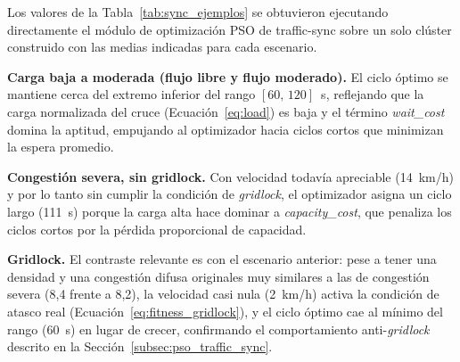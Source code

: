 Los valores de la Tabla~\ref{tab:sync_ejemplos} se obtuvieron ejecutando directamente el módulo de optimización PSO de traffic-sync sobre un solo clúster construido con las medias indicadas para cada escenario.

\textbf{Carga baja a moderada (flujo libre y flujo moderado).} El ciclo óptimo se mantiene cerca del extremo inferior del rango $[60,\,120]$~s, reflejando que la carga normalizada del cruce (Ecuación~\ref{eq:load}) es baja y el término \emph{wait\_cost} domina la aptitud, empujando al optimizador hacia ciclos cortos que minimizan la espera promedio.

\textbf{Congestión severa, sin gridlock.} Con velocidad todavía apreciable (14~km/h) y por lo tanto sin cumplir la condición de \emph{gridlock}, el optimizador asigna un ciclo largo (111~s) porque la carga alta hace dominar a \emph{capacity\_cost}, que penaliza los ciclos cortos por la pérdida proporcional de capacidad.

\textbf{Gridlock.} El contraste relevante es con el escenario anterior: pese a tener una densidad y una congestión difusa originales muy similares a las de congestión severa (8,4 frente a 8,2), la velocidad casi nula (2~km/h) activa la condición de atasco real (Ecuación~\ref{eq:fitness_gridlock}), y el ciclo óptimo cae al mínimo del rango (60~s) en lugar de crecer, confirmando el comportamiento anti-\emph{gridlock} descrito en la Sección~\ref{subsec:pso_traffic_sync}.

